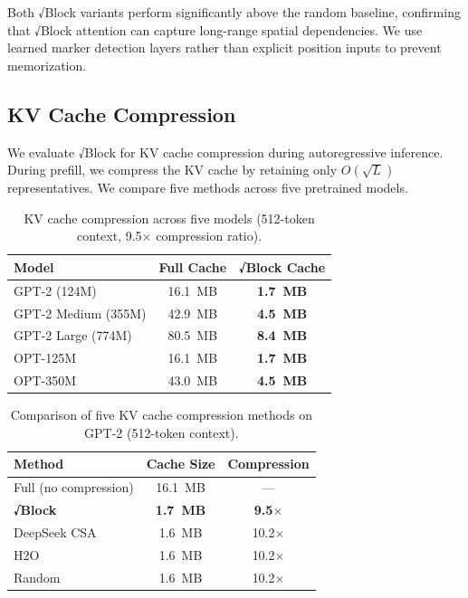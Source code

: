 \documentclass[11pt,a4paper]{article}
\begin{document}
Both √Block variants perform significantly above the random baseline, confirming that √Block attention can capture long-range spatial dependencies. We use learned marker detection layers rather than explicit position inputs to prevent memorization.

\subsection{KV Cache Compression}

We evaluate √Block for KV cache compression during autoregressive inference. During prefill, we compress the KV cache by retaining only $O(\sqrt{L})$ representatives. We compare five methods across five pretrained models.

\begin{table}[h]
\centering
\caption{KV cache compression across five models (512-token context, 9.5$\times$ compression ratio).}
\label{tab:kv}
\begin{tabular}{lcc}
\toprule
Model & Full Cache & √Block Cache \\
\midrule
GPT-2 (124M)      & 16.1~MB & \textbf{1.7~MB} \\
GPT-2 Medium (355M) & 42.9~MB & \textbf{4.5~MB} \\
GPT-2 Large (774M)  & 80.5~MB & \textbf{8.4~MB} \\
OPT-125M            & 16.1~MB & \textbf{1.7~MB} \\
OPT-350M            & 43.0~MB & \textbf{4.5~MB} \\
\bottomrule
\end{tabular}
\end{table}

\begin{table}[h]
\centering
\caption{Comparison of five KV cache compression methods on GPT-2 (512-token context).}
\label{tab:kv_methods}
\begin{tabular}{lcc}
\toprule
Method & Cache Size & Compression \\
\midrule
Full (no compression) & 16.1~MB & --- \\
\textbf{√Block}       & \textbf{1.7~MB} & \textbf{9.5$\times$} \\
DeepSeek CSA          & 1.6~MB & 10.2$\times$ \\
H2O                   & 1.6~MB & 10.2$\times$ \\
Random                & 1.6~MB & 10.2$\times$ \\
\bottomrule
\end{tabular}
\end{table}
\end{document}
